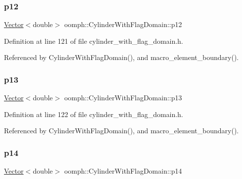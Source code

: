 \subsubsection{\texorpdfstring{p12}{p12}}
{\footnotesize\ttfamily \hyperlink{classoomph_1_1Vector}{Vector}$<$double$>$ oomph\+::\+Cylinder\+With\+Flag\+Domain\+::p12\hspace{0.3cm}{\ttfamily [private]}}



Definition at line 121 of file cylinder\+\_\+with\+\_\+flag\+\_\+domain.\+h.



Referenced by Cylinder\+With\+Flag\+Domain(), and macro\+\_\+element\+\_\+boundary().

\mbox{\label{classoomph_1_1CylinderWithFlagDomain_af96f841048a399c0d5b7cd4519c22d72}} 
\subsubsection{\texorpdfstring{p13}{p13}}
{\footnotesize\ttfamily \hyperlink{classoomph_1_1Vector}{Vector}$<$double$>$ oomph\+::\+Cylinder\+With\+Flag\+Domain\+::p13\hspace{0.3cm}{\ttfamily [private]}}



Definition at line 122 of file cylinder\+\_\+with\+\_\+flag\+\_\+domain.\+h.



Referenced by Cylinder\+With\+Flag\+Domain(), and macro\+\_\+element\+\_\+boundary().

\mbox{\label{classoomph_1_1CylinderWithFlagDomain_ac07282a9f587fc6f10b81506c59a2001}} 
\subsubsection{\texorpdfstring{p14}{p14}}
{\footnotesize\ttfamily \hyperlink{classoomph_1_1Vector}{Vector}$<$double$>$ oomph\+::\+Cylinder\+With\+Flag\+Domain\+::p14\hspace{0.3cm}{\ttfamily [private]}}



